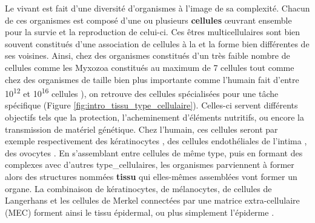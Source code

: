 Le vivant est fait d'une diversité d'\glspl{organisme} à l'image de sa complexité. Chacun de ces organismes est composé d'une ou plusieurs \textbf{cellules} œuvrant ensemble pour la survie et la reproduction de celui-ci. Ces êtres multicellulaires sont bien souvent constitués d’une association de cellules à la  et la forme bien différentes de ses voisines. Ainsi, chez des organismes constitués d'un très faible nombre de cellules comme les Myxozoa constitués au maximum de 7 cellules \cite{Morris2010Aug} tout comme chez des organismes de taille bien plus importante comme l'humain fait d'entre 10\textsuperscript{12} et 10\textsuperscript{16} cellules \cite{Bianconi2013}), on retrouve des cellules spécialisées pour une tâche spécifique \cite{Panina2020Sep} (Figure \ref{fig:intro_tissu_type_cellulaire}). Celles-ci servent différents objectifs tels que la protection, l'acheminement d'éléments nutritifs, ou encore la transmission de matériel génétique. Chez l’humain, ces cellules seront par exemple respectivement des kératinocytes \cite{Yuki2007Apr}, des cellules endothéliales de l’intima \cite{Yuan1991Aug}, des ovocytes \cite{Trounson2013}. En s’assemblant entre cellules de même type, puis en formant des complexes avec d’autres \glspl{type_cellulaire}, les organismes parviennent à former alors des structures nommées \textbf{\gls{tissu}} \cite{Hekselman2020Mar} qui elles-mêmes assemblées vont former un \gls{organe}. La combinaison de kératinocytes, de mélanocytes, de cellules de Langerhans et les cellules de Merkel connectées par une matrice extra-cellulaire (\acrshort{MEC}) forment ainsi le tissu épidermal, ou plus simplement l’épiderme \cite{Bettley1965}.

